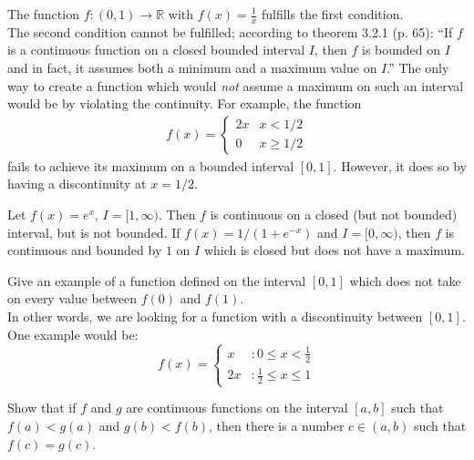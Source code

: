 \documentclass[12pt]{book}
\newcommand{\R}{\mathbb{R}}
\newenvironment{exercise}[2][Exercise]{\begin{trivlist}
\item[\hskip \labelsep {\bfseries #1}\hskip \labelsep {\bfseries #2.}]}{\end{trivlist}}
\begin{document}
\begin{exercise}{1.4.6}
\begin{exercise}{3.2.4}
The function $f: (0,1) \to \R$ with $f(x)=\frac{1}{x}$ fulfills the first condition. \\
The second condition cannot be fulfilled; according to theorem 3.2.1 (p. 65): ``If $f$ is a continuous function on a closed bounded interval $I$, then $f$ is bounded on $I$ and in fact, it assumes both a minimum and a maximum value on $I$.'' The only way to create a function which would \emph{not} assume a maximum on such an interval would be by violating the continuity. For example, the function	
	\begin{align*}
	f(x) =
		\begin{cases}
		2x & x< 1/2 \\
		0  & x \geq 1/2
		\end{cases}
	\end{align*}
fails to achieve its maximum on a bounded interval $[0,1]$. However, it does so by having a discontinuity at $x = 1/2$.
\end{exercise}

\begin{exercise}{3.2.5}
Let $f(x) = e^x$, $I = [1, \infty)$. Then $f$ is continuous on a closed (but not bounded) interval, but is not bounded. If $f(x) = 1/(1+e^{-x})$ and $I = [0, \infty)$, then $f$ is continuous and bounded by $1$ on $I$ which is closed but does not have a maximum. 
\end{exercise}


\begin{exercise}{3.2.7}
Give an example of a function defined on the interval $[0,1]$ which does not take on every value between $f(0)$ and $f(1)$. \\

In other words, we are looking for a function with a discontinuity between $[0,1]$. One example would be:
 \begin{displaymath}
   f(x) = \left\{
     \begin{array}{lr}
       x & : 0 \leq x < \frac{1}{2} \\
       2x & : \frac{1}{2} \leq x \leq 1
     \end{array}
   \right.
\end{displaymath} 

\end{exercise}


\begin{exercise}{3.2.8}
    Show that if $f$ and $g$ are continuous functions on the interval $[a,b]$ such that $f(a)< g(a)$ and $g(b)<f(b)$, then there is a number $c \in (a,b)$ such that $f(c)=g(c)$. 
    

\end{exercise}
\end{exercise}
\end{document}
